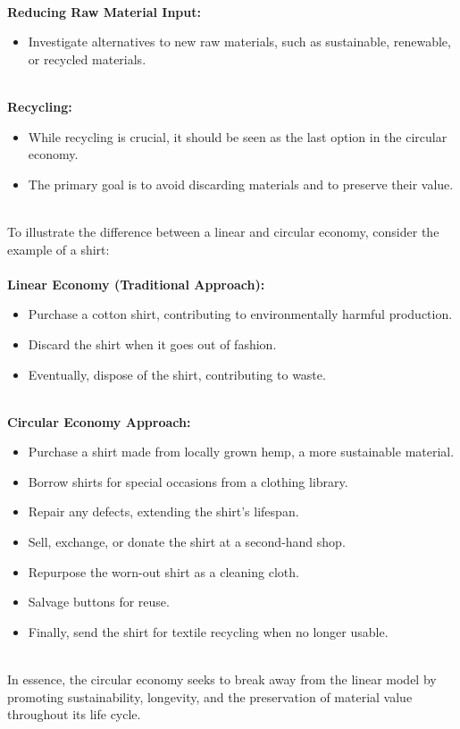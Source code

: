 \documentclass[../summary.tex]{subfiles}
\begin{document}
\ \\
\textbf{Reducing Raw Material Input:}
\begin{itemize}
	\itemsep0em 
	\item Investigate alternatives to new raw materials, such as sustainable, renewable, or recycled materials.
\end{itemize}
\ \\
\textbf{Recycling:}
\begin{itemize}
	\itemsep0em 
	\item While recycling is crucial, it should be seen as the last option in the circular economy.
	\item The primary goal is to avoid discarding materials and to preserve their value.
\end{itemize}
\newpage
\ \\
To illustrate the difference between a linear and circular economy, consider the example of a shirt:\\
\\
\textbf{Linear Economy (Traditional Approach):}
\begin{itemize}
	\itemsep0em 
	\item Purchase a cotton shirt, contributing to environmentally harmful production.
	\item Discard the shirt when it goes out of fashion.
	\item Eventually, dispose of the shirt, contributing to waste.
\end{itemize}
\ \\
\textbf{Circular Economy Approach:}
\begin{itemize}
	\itemsep0em 
	\item Purchase a shirt made from locally grown hemp, a more sustainable material.
	\item Borrow shirts for special occasions from a clothing library.
	\item Repair any defects, extending the shirt's lifespan.
	\item Sell, exchange, or donate the shirt at a second-hand shop.
	\item Repurpose the worn-out shirt as a cleaning cloth.
	\item Salvage buttons for reuse.
	\item Finally, send the shirt for textile recycling when no longer usable.
\end{itemize}
\ \\
In essence, the circular economy seeks to break away from the linear model by promoting sustainability, longevity, and the preservation of material value throughout its life cycle.\\
\end{document}
